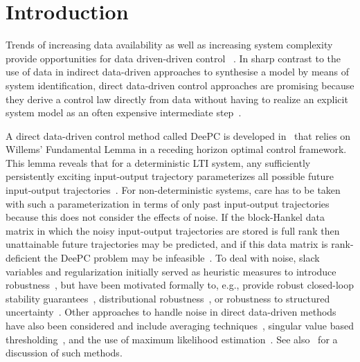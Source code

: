 \section{Introduction}
Trends of increasing data availability as well as increasing system complexity provide opportunities for data driven-driven control%
~\citep{Hou2013}. In sharp contrast to the use of data in %
indirect data-driven approaches to synthesise a model by means of system identification, direct data-driven control approaches are promising because they derive a control law directly from data without having to realize an explicit system model as an often expensive intermediate step~\citep{Hjalmarsson2005}.

A direct data-driven control method called \ac{DeePC} is developed in~\cite{Coulson2019} that relies on Willems' Fundamental Lemma in a receding horizon optimal control framework. This lemma reveals that for a deterministic \ac{LTI} system, any sufficiently persistently exciting input-output trajectory parameterizes all possible future input-output trajectories~\citep{Willems2005}.%
% 
For non-deterministic systems, care has to be taken with such a parameterization in terms of only past input-output trajectories because this does not consider the effects of noise. If the block-Hankel data matrix in which the noisy input-output trajectories are stored is full rank then unattainable future trajectories may be predicted, and if this data matrix is rank-deficient the \ac{DeePC} problem may be infeasible~\citep{Markovsky2022}. To deal with noise, slack variables and regularization initially served as heuristic measures to introduce robustness~\citep{Coulson2019}, but have been motivated formally to, e.g., provide robust closed-loop stability guarantees~\citep{Berberich2021}, distributional robustness~\citep{Coulson2019a}, or robustness to structured uncertainty~\citep{Huang2023}. Other approaches to handle noise in direct data-driven methods have also been considered and include averaging techniques~\citep{Jo2022}, singular value based thresholding~\citep{Sassella2022}, and the use of maximum likelihood estimation~\citep{Yin2023}. See also~\cite{Sassella2023} for a discussion of such methods. 

